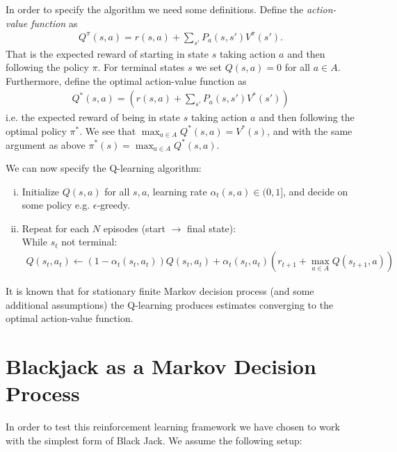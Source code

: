 In order to specify the algorithm we need some definitions. Define the \textit{action-value function} as
\begin{align} \label{eq:Qfun_policy}
	Q^{\pi} ( s,a  ) = r(s,a) + \sum_{s'} P_{a}(s,s')V^{\pi}(s').
\end{align}
That is the expected reward of starting in state $s$ taking action $a$ and then following the policy $\pi$. For terminal states $s$ we set $Q(s,a)=0$ for all $a\in A$. Furthermore, define the optimal action-value function as
\begin{align} \label{eq:Qfun_optimal}
Q^*  ( s,a  ) =  (r(s,a) + \sum_{s'} P_{a}(s,s')V^{* }(s'))
\end{align}
i.e. the expected reward of being in state $s$ taking action $a$ and then following the optimal policy $\pi^*$. We see that $\max_{a \in A} Q^*(s,a) = V^*(s)$, and 
with the same argument as above $\pi^*(s) = \max_{a \in A}Q^*(s,a)$. 

We can now specify the Q-learning algorithm:

\begin{enumerate}[(i)]
	\item Initialize $Q(s,a)$ for all $s,a$, learning rate $\alpha_t(s,a) \in (0,1]$, and decide on some policy e.g. $\epsilon$-greedy.
	\item Repeat for each $N$ episodes (start $\to$ final state): \\
	While $s_t$ not terminal:  
	\begin{align} \label{eq:Qupdate}
          Q(s_t,a_t)  \leftarrow (1-\alpha_t(s_t,a_t))Q(s_t,a_t) + \alpha_t(s_t,a_t)( r_{t+1} + \max_{a \in A} Q(s_{t+1},a) )
        \end{align}
\end{enumerate}
It is known that for stationary finite Markov decision process (and some additional assumptions) the Q-learning produces estimates converging to the optimal action-value function.


\section{Blackjack as a Markov Decision Process} \label{sec:bjMDP}
In order to test this reinforcement learning framework we have chosen to work with the simplest form of Black Jack. We assume the following setup:

